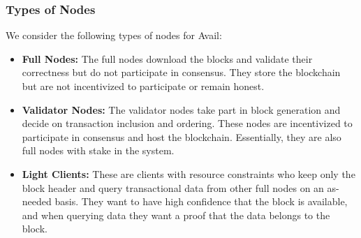 \documentclass[sigconf, screen=true, nonacm]{acmart}
\newcommand{\DA}{\textit{DA layer}}
\begin{document}
        \subsubsection{Types of Nodes} 
            We consider the following types of nodes for Avail: 
            \begin{itemize}
                \item \textbf{Full Nodes:} The full nodes download the blocks and validate their correctness but do not participate in consensus. They store the blockchain but are not incentivized to participate or remain honest.
                \item \textbf{Validator Nodes:} The validator nodes take part in block generation and decide on transaction inclusion and ordering. These nodes are incentivized to participate in consensus and host the blockchain. Essentially, they are also full nodes with stake in the system. 
                \item \textbf{Light Clients:} These are clients with resource constraints who keep only the block header and query transactional data from other full nodes on an as-needed basis. They want to have high confidence that the block is available, and when querying data they want a proof that the data belongs to the block. 
            \end{itemize}
\end{document}
